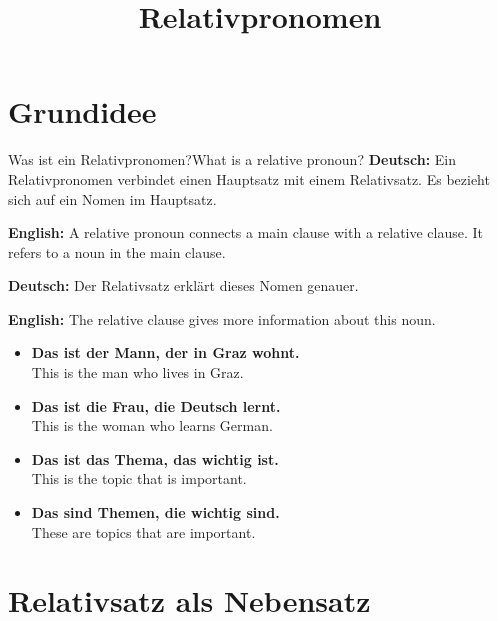 \documentclass[a4paper,11pt]{article}
\title{Relativpronomen}
\date{}
\newcommand{\GermanText}[1]{\textbf{Deutsch: }#1\par}
\newcommand{\EnglishText}[1]{{\small\color{SoftGray}\textbf{English: }#1\par}}
\newcommand{\ExampleItem}[2]{\item \textbf{#1}\\{\small\color{SoftGray}#2}}
\begin{document}
    \maketitle
    \tableofcontents
    \newpage
    
    
    \section{Grundidee}
        
        \begin{grammarentry}{Was ist ein Relativpronomen?}{What is a relative pronoun?}
            \GermanText{Ein Relativpronomen verbindet einen Hauptsatz mit einem Relativsatz. Es bezieht sich auf ein Nomen im Hauptsatz.}
            \EnglishText{A relative pronoun connects a main clause with a relative clause. It refers to a noun in the main clause.}
            
            \GermanText{Der Relativsatz erklärt dieses Nomen genauer.}
            \EnglishText{The relative clause gives more information about this noun.}
            
            \begin{exbox}
                \begin{itemize}
                    \ExampleItem{Das ist der Mann, der in Graz wohnt.}{This is the man who lives in Graz.}
                    \ExampleItem{Das ist die Frau, die Deutsch lernt.}{This is the woman who learns German.}
                    \ExampleItem{Das ist das Thema, das wichtig ist.}{This is the topic that is important.}
                    \ExampleItem{Das sind Themen, die wichtig sind.}{These are topics that are important.}
                \end{itemize}
            \end{exbox}
        \end{grammarentry}
    
    
    \section{Relativsatz als Nebensatz}
        
\end{document}
